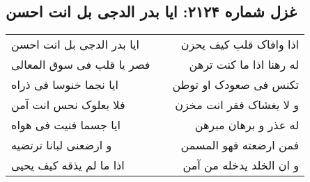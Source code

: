 \begin{center}
\section*{غزل شماره ۲۱۲۴: ایا بدر الدجی بل انت احسن}
\label{sec:2124}
\begin{longtable}{l p{0.5cm} r}
ایا بدر الدجی بل انت احسن
&&
اذا وافاک قلب کیف یحزن
\\
فصر یا قلب فی سوق المعالی
&&
له رهنا اذا ما کنت ترهن
\\
ایا نجما خنوسا فی ذراه
&&
تکنس فی صعودک او توطن
\\
فلا یعلوک نحس انت آمن
&&
و لا یغشاک فقر انت مخزن
\\
ایا جسما فنیت فی هواه
&&
له عذر و برهان مبرهن
\\
و ارضعنی لبانا ترتضیه
&&
فمن ارضعته فهو المسمن
\\
اذا ما لم یذقه کیف یحیی
&&
و ان الخلد یدخله من آمن
\\
\end{longtable}
\end{center}

